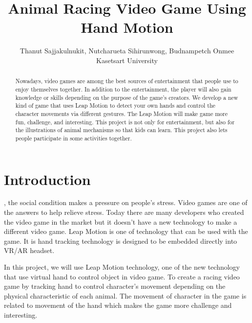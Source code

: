 \documentclass[journal]{IEEEtran}										    %
\title{\textbf{Animal Racing Video Game Using Hand Motion}}
\author{Thanut Sajjakulnukit, Nutcharueta Sihirunwong, Budnampetch Onmee \\
    \Large Kasetsart University }
\begin{document}
    \maketitle
    
    \begin{abstract}                                                        %
        Nowadays, video games are among the best sources of entertainment 
        that people use to enjoy themselves together. In addition to the 
        entertainment, the player will also gain knowledge or skills 
        depending on the purpose of the game's creators. We  develop a new 
        kind of game that uses Leap Motion to detect your own hands and 
        control the character movements via different gestures. 
        The Leap Motion will make game more fun, challenge, and interesting. 
        This project is not only for entertainment, but also for the 
        illustrations of animal mechanisms so that kids can learn. 
        This project also lets people participate in some activities together.

    \end{abstract}

    \section{Introduction}                                                  %
        , the social condition makes a pressure 
        on people's stress. Video games are one of the answers to help relieve 
        stress. Today there are many developers who created the video 
        game in the market but it doesn't have a new technology to make 
        a different video game. Leap Motion is one of technology that 
        can be used with the game. It is hand tracking technology is 
        designed to be embedded directly into VR/AR headset. 

        In this project, we will use Leap Motion technology, one of
        the new technology that use virtual hand to control object
        in video game. To create a racing video game by tracking 
        hand to control character's movement depending on the 
        physical characteristic of each animal. The movement of 
        character in the game is related to movement of the hand 
        which makes the game more challenge and interesting.
        
\end{document}
